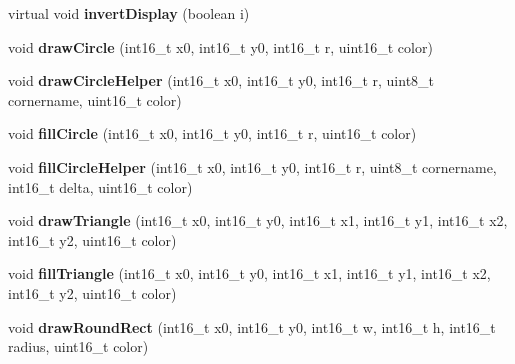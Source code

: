 \begin{DoxyCompactItemize}
\item 
\hypertarget{class_adafruit___g_f_x_a2fa315803f39a5e73b1841874daf0483}{}virtual void {\bfseries invert\+Display} (boolean i)\label{class_adafruit___g_f_x_a2fa315803f39a5e73b1841874daf0483}

\item 
\hypertarget{class_adafruit___g_f_x_a648d2d6765e488b4556e802167d885fb}{}void {\bfseries draw\+Circle} (int16\+\_\+t x0, int16\+\_\+t y0, int16\+\_\+t r, uint16\+\_\+t color)\label{class_adafruit___g_f_x_a648d2d6765e488b4556e802167d885fb}

\item 
\hypertarget{class_adafruit___g_f_x_a3f2dd7b698e7b95ebf9fecf992ff802e}{}void {\bfseries draw\+Circle\+Helper} (int16\+\_\+t x0, int16\+\_\+t y0, int16\+\_\+t r, uint8\+\_\+t cornername, uint16\+\_\+t color)\label{class_adafruit___g_f_x_a3f2dd7b698e7b95ebf9fecf992ff802e}

\item 
\hypertarget{class_adafruit___g_f_x_a623e031e58492fb41e9fde6a05d97c12}{}void {\bfseries fill\+Circle} (int16\+\_\+t x0, int16\+\_\+t y0, int16\+\_\+t r, uint16\+\_\+t color)\label{class_adafruit___g_f_x_a623e031e58492fb41e9fde6a05d97c12}

\item 
\hypertarget{class_adafruit___g_f_x_a2242d3560b08c6480084152b6660052a}{}void {\bfseries fill\+Circle\+Helper} (int16\+\_\+t x0, int16\+\_\+t y0, int16\+\_\+t r, uint8\+\_\+t cornername, int16\+\_\+t delta, uint16\+\_\+t color)\label{class_adafruit___g_f_x_a2242d3560b08c6480084152b6660052a}

\item 
\hypertarget{class_adafruit___g_f_x_a49284b9cea16ecf8c15dfd0b51a841e6}{}void {\bfseries draw\+Triangle} (int16\+\_\+t x0, int16\+\_\+t y0, int16\+\_\+t x1, int16\+\_\+t y1, int16\+\_\+t x2, int16\+\_\+t y2, uint16\+\_\+t color)\label{class_adafruit___g_f_x_a49284b9cea16ecf8c15dfd0b51a841e6}

\item 
\hypertarget{class_adafruit___g_f_x_a4cd646a3d9c9d5b3ee50010d0aa387cd}{}void {\bfseries fill\+Triangle} (int16\+\_\+t x0, int16\+\_\+t y0, int16\+\_\+t x1, int16\+\_\+t y1, int16\+\_\+t x2, int16\+\_\+t y2, uint16\+\_\+t color)\label{class_adafruit___g_f_x_a4cd646a3d9c9d5b3ee50010d0aa387cd}

\item 
\hypertarget{class_adafruit___g_f_x_ab496b247abec724ef80e17a30257972b}{}void {\bfseries draw\+Round\+Rect} (int16\+\_\+t x0, int16\+\_\+t y0, int16\+\_\+t w, int16\+\_\+t h, int16\+\_\+t radius, uint16\+\_\+t color)\label{class_adafruit___g_f_x_ab496b247abec724ef80e17a30257972b}


\end{DoxyCompactItemize}
